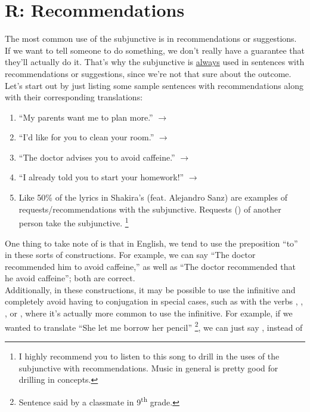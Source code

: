 \section{R: Recommendations}

The most common use of the subjunctive is in recommendations or suggestions. \\

If we want to tell someone to do something, we don't really have a guarantee that they'll actually do it. That's why the subjunctive is \underline{always} used in sentences with recommendations or suggestions, since we're not that sure about the outcome.\\

Let's start out by just listing some sample sentences with recommendations along with their corresponding translations:
\begin{enumerate}[noitemsep]
	\item ``My parents want me to plan more.'' $\rightarrow$ 
	\item ``I'd like for you to clean your room.'' $\rightarrow$ 
	\item ``The doctor advises you to avoid caffeine.'' $\rightarrow$ 
	\item ``I already told you to start your homework!'' $\rightarrow$ 
	\item Like 50\% of the lyrics in Shakira's (feat. Alejandro Sanz)  are examples of requests/recommendations with the subjunctive. Requests () of another person take the subjunctive.  \footnote{I highly recommend you to listen to this song to drill in the uses of the subjunctive with recommendations. Music in general is pretty good for drilling in concepts. }
\end{enumerate}

One thing to take note of is that in English, we tend to use the preposition ``to'' in these sorts of constructions. For example, we can say ``The doctor recommended him to avoid caffeine,'' as well as ``The doctor recommended that he avoid caffeine''; both are correct.\\ 

Additionally, in these constructions, it may be possible to use the infinitive and completely avoid having to conjugation in special cases, such as with the verbs ,  , , or , where it's actually more common to use the infinitive. For example, if we wanted to translate ``She let me borrow her pencil'' \footnote{Sentence said by a classmate in 9\textsuperscript{th} grade.}, we can just say , instead of 

